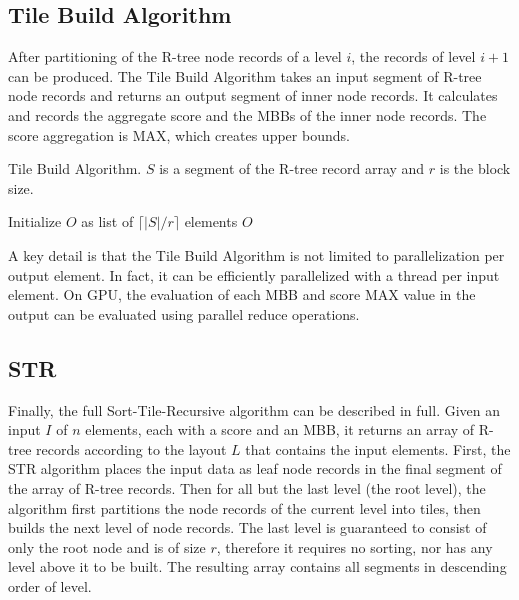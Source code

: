 \subsection{Tile Build Algorithm}

After partitioning of the R-tree node records of a level \(i\), the records of level \(i + 1\) can be produced. The Tile Build Algorithm takes an input segment of R-tree node records and returns an output segment of inner node records. It calculates and records the aggregate score and the MBBs of the inner node records. The score aggregation is MAX, which creates upper bounds.

\begin{algorithm}
  \caption{Tile Build Algorithm. \(S\) is a segment of the R-tree record array and \(r\) is the block size.}
  \label{alg/tile-build}
  \begin{algorithmic}[1]
      \State Initialize \(O\) as list of \(\lceil |S| / r \rceil\) elements
      \EndFor
      \State \Return \(O\)
    \EndFunction
  \end{algorithmic}
\end{algorithm}

A key detail is that the Tile Build Algorithm is not limited to parallelization per output element. In fact, it can be efficiently parallelized with a thread per input element. On GPU, the evaluation of each MBB and score MAX value in the output can be evaluated using parallel reduce operations.

\subsection{STR}

Finally, the full Sort-Tile-Recursive algorithm can be described in full. Given an input \(I\) of \(n\) elements, each with a score and an MBB, it returns an array of R-tree records according to the layout \(L\) that contains the input elements. First, the STR algorithm places the input data as leaf node records in the final segment of the array of R-tree records. Then for all but the last level (the root level), the algorithm first partitions the node records of the current level into tiles, then builds the next level of node records. The last level is guaranteed to consist of only the root node and is of size \(r\), therefore it requires no sorting, nor has any level above it to be built. The resulting array contains all segments in descending order of level.

